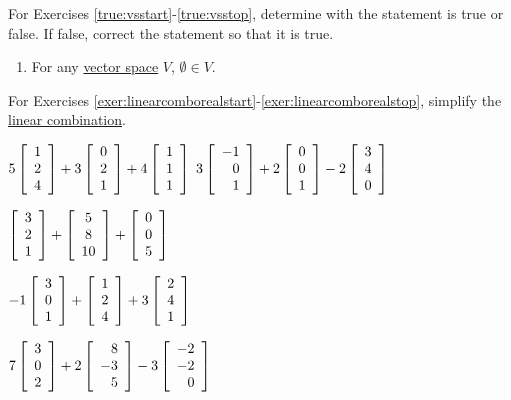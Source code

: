 
\noindent For Exercises \ref{true:vsstart}-\ref{true:vsstop}, determine with the statement is true or false. If false, correct the statement so that it is true.
\begin{enumerate}[!HW!, start=1]
\item\label{true:vsstart}\label{true:vsstop} For any \hyperref[def:vectorspace]{vector space} $V$, $\emptyset\in V$. %
\end{enumerate}

\noindent For Exercises \ref{exer:linearcomborealstart}-\ref{exer:linearcomborealstop}, simplify the \hyperref[def:linearcombo]{linear combination}. 
\begin{enumerate}[!HW!]
\begin{multicols}{2}
\item\label{exer:linearcomborealstart} $5\vr{1\\2\\4}+3\vr{0\\2\\1}+4\vr{1\\1\\1}$ %
\itemspade $3\vr{-1\\0\\1} + 2\vr{0\\0\\1}-2\vr{3\\4\\0}$
\end{multicols}
\begin{multicols}{2}
\item $\vr{3\\2\\1} + \mtx{c}{5\\8\\10} + \vr{0\\0\\5}$ %
\item $-1\vr{3\\0\\1}+\vr{1\\2\\4} + 3\vr{2\\4\\1}$ %
\end{multicols}
\begin{multicols}{2}
\item $7\vr{3\\0\\2}+2\vr{8\\-3\\5}-3\vr{-2\\-2\\0}$ %

\end{multicols}
\end{enumerate}
